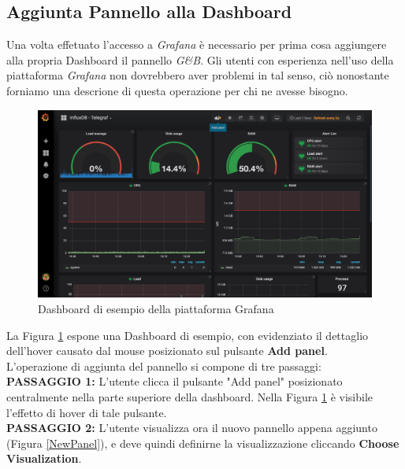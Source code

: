 \subsection{Aggiunta Pannello alla Dashboard}\label{AddPanel}

Una volta effetuato l'accesso a \textit{Grafana} è necessario per prima cosa aggiungere alla propria Dashboard il pannello \textit{G\&B}. Gli utenti con esperienza nell'uso della piattaforma \textit{Grafana} non dovrebbero aver problemi in tal senso, ciò nonostante forniamo una descrione di questa operazione per chi ne avesse bisogno.\\

\begin{figure}[H]
	\begin{center}
		\includegraphics[scale=0.33]{./images/Dashboard.png}
		 \caption{Dashboard di esempio della piattaforma Grafana}	
		 \label{Dashboard}
	\end{center}
\end{figure}

La Figura \ref{Dashboard} espone una Dashboard di esempio, con evidenziato il dettaglio dell'hover causato dal mouse posizionato sul pulsante \textbf{Add panel}.\\
L'operazione di aggiunta del pannello si compone di tre passaggi:
~\\

\textbf{PASSAGGIO 1:} L'utente clicca il pulsante "Add panel" posizionato centralmente nella parte superiore della dashboard. Nella Figura \ref{Dashboard} è visibile l'effetto di hover di tale pulsante.
~\\

\textbf{PASSAGGIO 2:} L'utente visualizza ora il nuovo pannello appena aggiunto (Figura \ref{NewPanel}), e deve quindi definirne la visualizzazione cliccando \textbf{Choose Visualization}.

